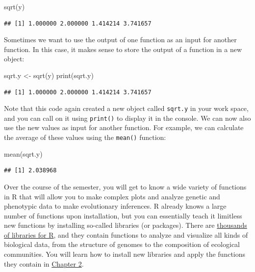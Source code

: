 \documentclass[
]{book}
\newenvironment{Shaded}{\begin{snugshade}}{\end{snugshade}}
\newcommand{\FunctionTok}[1]{\textcolor[rgb]{0.00,0.00,0.00}{#1}}
\newcommand{\NormalTok}[1]{#1}
\newcommand{\OtherTok}[1]{\textcolor[rgb]{0.56,0.35,0.01}{#1}}
\begin{document}
\begin{Shaded}
\begin{Highlighting}[]
\FunctionTok{sqrt}\NormalTok{(y)}
\end{Highlighting}
\end{Shaded}

\begin{verbatim}
## [1] 1.000000 2.000000 1.414214 3.741657
\end{verbatim}

Sometimes we want to use the output of one function as an input for another function. In this case, it makes sense to store the output of a function in a new object:

\begin{Shaded}
\begin{Highlighting}[]
\NormalTok{sqrt.y }\OtherTok{\textless{}{-}} \FunctionTok{sqrt}\NormalTok{(y)}
\FunctionTok{print}\NormalTok{(sqrt.y)}
\end{Highlighting}
\end{Shaded}

\begin{verbatim}
## [1] 1.000000 2.000000 1.414214 3.741657
\end{verbatim}

Note that this code again created a new object called \texttt{sqrt.y} in your work space, and you can call on it using \texttt{print()} to display it in the console. We can now also use the new values as input for another function. For example, we can calculate the average of these values using the \texttt{mean()} function:

\begin{Shaded}
\begin{Highlighting}[]
\FunctionTok{mean}\NormalTok{(sqrt.y)}
\end{Highlighting}
\end{Shaded}

\begin{verbatim}
## [1] 2.038968
\end{verbatim}

Over the course of the semester, you will get to know a wide variety of functions in R that will allow you to make complex plots and analyze genetic and phenotypic data to make evolutionary inferences. R already knows a large number of functions upon installation, but you can essentially teach it limitless new functions by installing so-called libraries (or packages). There are \href{https://cran.r-project.org/web/packages/available_packages_by_name.html}{thousands of libraries for R}, and they contain functions to analyze and visualize all kinds of biological data, from the structure of genomes to the composition of ecological communities. You will learn how to install new libraries and apply the functions they contain in \href{evidence-for-evolution.html\#libraries}{Chapter 2}.
\end{document}
